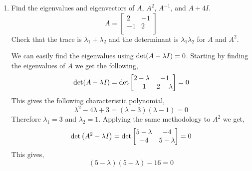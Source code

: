 \begin{enumerate}[label=\arabic*.]
    \item Find the eigenvalues and eigenvectors of $A$, $A^{2}$, $A^{-1}$,
        and $A+4I$.
        \begin{equation}
            A =
            \begin{bmatrix}
                2  & -1 \\
                -1 & 2  \\
            \end{bmatrix}
        \end{equation}
        Check that the trace is $\lambda_{1} + \lambda_{2}$ and the
        determinant is $\lambda_{1} \lambda_{2}$ for $A$ and $A^{2}$.
        \begin{mdframed}[style=MyFrame]
            We can easily find the eigenvalues using $\text{det}(A-\lambda I) =
            0$. Starting by finding the eigenvalues of $A$ we get the
            following,
            \begin{equation}
                \text{det}(A-\lambda I) = 
                \text{det}
                \begin{bmatrix}
                    2-\lambda           &   -1              \\
                    -1                  &   2-\lambda
                \end{bmatrix}
                = 0
            \end{equation}
            This gives the following characteristic polynomial,
            \begin{equation}
                \lambda^{2}-4\lambda+3 = (\lambda -3)(\lambda -1)=0
            \end{equation}
            Therefore  $\lambda_{1} =3$ and $\lambda_{2} = 1$. Applying the
            same methodology to $A^{2}$ we get,
            \begin{equation}
                \text{det} \left(A^{2} -\lambda I \right) = 
                \text{det}
                \begin{bmatrix}
                    5-\lambda           &   -4             \\
                    -4                  &   5-\lambda
                \end{bmatrix}
                = 0
            \end{equation}
            This gives,
            \begin{equation}
                \left(5-\lambda\right)\left(5-\lambda\right)-16 = 0 

\end{equation}
\end{mdframed}
\end{enumerate}
